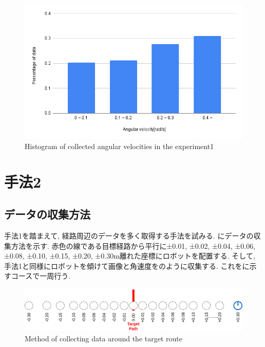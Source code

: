 \begin{figure}[h]
  \centering
  \includegraphics[keepaspectratio, scale=0.6]{images/exp1.png}
  \caption{Histogram of collected angular velocities in the experiment1}
  \label{Fig:exp1}
  \end{figure}

\newpage
\section{手法2}

\subsection{データの収集方法}
手法1を踏まえて, 経路周辺のデータを多く取得する手法を試みる. にデータの収集方法を示す. 赤色の線である目標経路から平行に±0.01, ±0.02, ±0.04, ±0.06, ±0.08, ±0.10, ±0.15, ±0.20, ±0.30m離れた座標にロボットを配置する. そして, 手法1と同様にロボットを傾けて画像と角速度をのように収集する. これをに示すコースで一周行う. 

\begin{figure}[h]
  \centering
  \includegraphics[keepaspectratio, scale=0.18]{images/collect-data.png}
  \caption{Method of collecting data around the target route}
  \label{Fig:collect-data}
  \end{figure}

\vspace{15mm}
